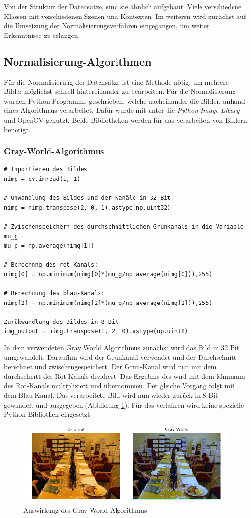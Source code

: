 \documentclass[a4paper,12pt,oneside]{article}
\begin{document}
Von der Struktur der Datensätze, sind sie ähnlich aufgebaut. Viele verschiedene Klassen mit verschiedenen Szenen und Kontexten. Im weiteren wird zunächst auf die Umsetzung der Normalisierungsverfahren eingegangen, um weiter Erkenntnisse zu erlangen.
\newpage
\subsection{Normalisierung-Algorithmen}\label{s.nalgorithmen}
Für die Normalisierung der Datensätze ist eine Methode nötig, um mehrere Bilder möglichst schnell hintereinander zu bearbeiten. Für die Normalisierung wurden Python Programme geschrieben, welche nacheinander die Bilder, anhand eines Algorithmus verarbeitet. Dafür wurde mit unter die \textit{Python Image Libary} und OpenCV genutzt. Beide Bibliotheken werden für das verarbeiten von Bildern benötigt. 
\subsubsection{Gray-World-Algorithmus}
\begin{lstlisting}
# Importieren des Bildes
nimg = cv.imread(i, 1)

# Umwandlung des Bildes und der Kanäle in 32 Bit
nimg = nimg.transpose(2, 0, 1).astype(np.uint32)

# Zwischenspeichern des durchschnittlichen Grünkanals in die Variable mu_g
mu_g = np.average(nimg[1])

# Berechnng des rot-Kanals: 
nimg[0] = np.minimum(nimg[0]*(mu_g/np.average(nimg[0])),255)

# Berechnung des blau-Kanals:
nimg[2] = np.minimum(nimg[2]*(mu_g/np.average(nimg[2])),255)

Zurükwandlung des Bildes in 8 Bit
img_output = nimg.transpose(1, 2, 0).astype(np.uint8)
\end{lstlisting}
In dem verwendeten Gray World Algorithmus \cite{gray2012world} zunächst wird das Bild in 32 Bit umgewandelt. Daraufhin wird der Grünkanal verwendet und der Durchschnitt berechnet und zwischengespeichert. Der Grün-Kanal wird nun mit dem durchschnitt des Rot-Kanals dividiert. Das Ergebnis des wird mit dem Minimum des Rot-Kanals multipliziert und übernommen. Der gleiche Vorgang folgt mit dem Blau-Kanal. Das verarbeitete Bild wird nun wieder zurück in 8 Bit gewandelt und ausgegeben (Abbildung \ref{img:gwnimg}). Für das verfahren wird keine spezielle Python Bibliothek eingesetzt.
\begin{figure}
	[h]
	\centering
	\includegraphics[scale=0.7]{Sources/gwn.png}
	\caption{Auswirkung des Gray-World Algorithmus}
	\label{img:gwnimg}
\end{figure}
\newpage
\end{document}
